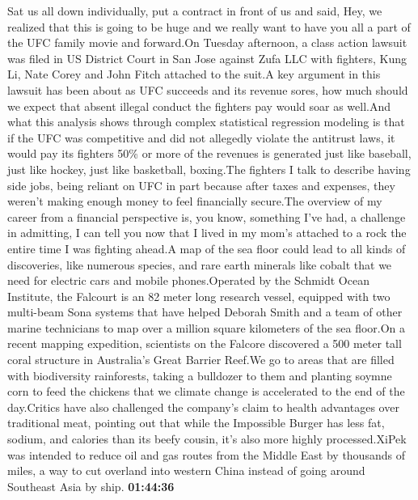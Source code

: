 \documentclass{article}%
\begin{document}
Sat us all down individually, put a contract in front of us and said, Hey, we realized that this is going to be huge and we really want to have you all a part of the UFC family movie and forward.On Tuesday afternoon, a class action lawsuit was filed in US District Court in San Jose against Zufa LLC with fighters, Kung Li, Nate Corey and John Fitch attached to the suit.A key argument in this lawsuit has been about as UFC succeeds and its revenue sores, how much should we expect that absent illegal conduct the fighters pay would soar as well.And what this analysis shows through complex statistical regression modeling is that if the UFC was competitive and did not allegedly violate the antitrust laws, it would pay its fighters 50\% or more of the revenues is generated just like baseball, just like hockey, just like basketball, boxing.The fighters I talk to describe having side jobs, being reliant on UFC in part because after taxes and expenses, they weren't making enough money to feel financially secure.The overview of my career from a financial perspective is, you know, something I've had, a challenge in admitting, I can tell you now that I lived in my mom's attached to a rock the entire time I was fighting ahead.A map of the sea floor could lead to all kinds of discoveries, like numerous species, and rare earth minerals like cobalt that we need for electric cars and mobile phones.Operated by the Schmidt Ocean Institute, the Falcourt is an 82 meter long research vessel, equipped with two multi{-}beam Sona systems that have helped Deborah Smith and a team of other marine technicians to map over a million square kilometers of the sea floor.On a recent mapping expedition, scientists on the Falcore discovered a 500 meter tall coral structure in Australia's Great Barrier Reef.We go to areas that are filled with biodiversity rainforests, taking a bulldozer to them and planting soymne corn to feed the chickens that we climate change is accelerated to the end of the day.Critics have also challenged the company's claim to health advantages over traditional meat, pointing out that while the Impossible Burger has less fat, sodium, and calories than its beefy cousin, it's also more highly processed.XiPek was intended to reduce oil and gas routes from the Middle East by thousands of miles, a way to cut overland into western China instead of going around Southeast Asia by ship.%
\textbf{01:44:36}%
\newline%
\end{document}
